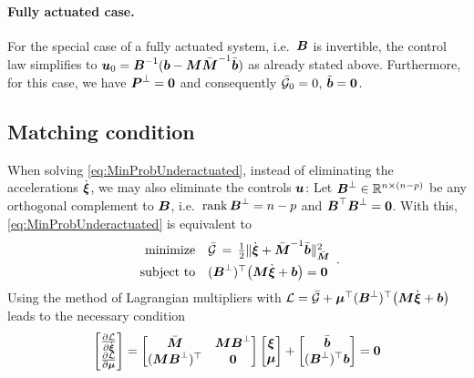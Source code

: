 \paragraph{Fully actuated case.}
For the special case of a fully actuated system, i.e.\ $\sysInputMat$ is invertible, the control law simplifies to $\sysInput_0 = \sysInputMat^{-1} (\sysForce - \sysInertiaMat \sysInertiaMatC^{-1}\sysForceC)$ as already stated above.
Furthermore, for this case, we have $\mat{P}^\bot = \mat{0}$ and consequently $\GaussianConstraintC_0=0$, $\tilde{\sysForce}=\tuple{0}$.

\subsection{Matching condition}\label{sec:MatchingCondition}
When solving \eqref{eq:MinProbUnderactuated}, instead of eliminating the accelerations $\sysVeld$, we may also eliminate the controls $\sysInput$:
Let $\sysInputMatLComp \in \RealNum^{\dimConfigSpace\times(\dimConfigSpace-\numInputs)}$ be any orthogonal complement to $\sysInputMat$, i.e.\ $\rank \sysInputMatLComp = \dimConfigSpace-\numInputs$ and $\sysInputMat^\top \sysInputMatLComp = \mat{0}$.
With this, \eqref{eq:MinProbUnderactuated} is equivalent to
\begin{align}\label{eq:MinProbUnderactuatedMatch}
 \begin{array}{rl}
  \text{minimize} & \GaussianConstraintC \, = \, \tfrac{1}{2} \norm[\sysInertiaMatC]{\sysVeld + \sysInertiaMatC^{-1} \sysForceC}^2
  \\[1ex]
  \text{subject to} & (\sysInputMatLComp)^\top \big(\sysInertiaMat \sysVeld + \sysForce\big) = \tuple{0}
 \end{array}
 .
\end{align}
Using the method of Lagrangian multipliers with $\Lagrangian = \GaussianConstraintC + \tuple{\mu}^\top (\sysInputMatLComp)^\top \big(\sysInertiaMat \sysVeld + \sysForce\big)$ 
leads to the necessary condition
\begin{align}
  \begin{bmatrix} \pdiff[\Lagrangian]{\sysVeld} \\ \pdiff[\Lagrangian]{\tuple{\mu}} \end{bmatrix}
  =
  \begin{bmatrix} \sysInertiaMatC & \sysInertiaMat \sysInputMatLComp \\ (\sysInertiaMat \sysInputMatLComp)^\top & \mat{0} \end{bmatrix}
  \begin{bmatrix} \sysVel \\ \tuple{\mu} \end{bmatrix}
  +
  \begin{bmatrix} \sysForceC \\ (\sysInputMatLComp)^\top\sysForce \end{bmatrix}
  = \tuple{0}
\end{align}
